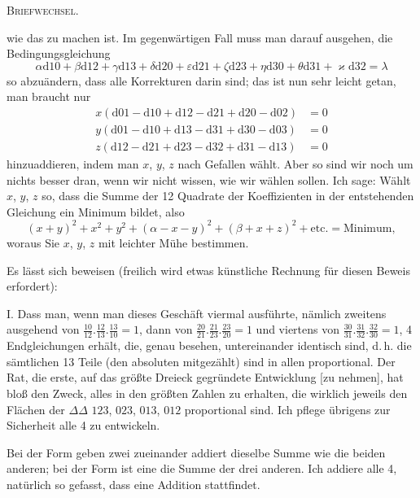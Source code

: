 \begingroup
\clearpage
{}\hfill\textsc{Briefwechsel.}\hfill\mbox{}\par\medskip
\noindent wie das zu machen ist. Im gegenwärtigen Fall muss man darauf ausgehen, die Bedingungsgleichung
\[
\alpha\mathrm d10+\beta\mathrm d12+\gamma\mathrm d13+\delta\mathrm d20+\varepsilon\mathrm d21+\zeta\mathrm d23+\eta\mathrm d30+\theta\mathrm d31+\varkappa\mathrm d32=\lambda
\]
so abzuändern, dass alle Korrekturen darin sind; das ist nun sehr leicht getan, man braucht nur
\[
\begin{aligned}
x(\mathrm d01-\mathrm d10+\mathrm d12-\mathrm d21+\mathrm d20-\mathrm d02)&=0\\
y(\mathrm d01-\mathrm d10+\mathrm d13-\mathrm d31+\mathrm d30-\mathrm d03)&=0\\
z(\mathrm d12-\mathrm d21+\mathrm d23-\mathrm d32+\mathrm d31-\mathrm d13)&=0
\end{aligned}
\]
hinzuaddieren, indem man $x$, $y$, $z$ nach Gefallen wählt. Aber so sind wir noch um nichts besser dran, wenn wir nicht wissen, wie wir wählen sollen. Ich sage: Wählt $x$, $y$, $z$ so, dass die Summe der 12 Quadrate der Koeffizienten in der entstehenden Gleichung ein Minimum bildet, also
\[
(x+y)^2+x^2+y^2+(\alpha-x-y)^2+(\beta+x+z)^2+\text{etc.}=\text{Minimum},
\]
woraus Sie $x$, $y$, $z$ mit leichter Mühe bestimmen.

Es lässt sich beweisen (freilich wird etwas künstliche Rechnung für diesen Beweis erfordert):

I. Dass man, wenn man dieses Geschäft viermal ausführte, nämlich zweitens ausgehend von $\frac{10}{12}.\allowbreak \frac{12}{13}.\allowbreak \frac{13}{10}=1$, dann von $\frac{20}{21}.\allowbreak \frac{21}{23}.\allowbreak \frac{23}{20}=1$ und viertens von $\frac{30}{31}.\allowbreak \frac{31}{32}.\allowbreak \frac{32}{30}=1$, 4 Endgleichungen erhält, die, genau besehen, untereinander identisch sind, d.\,h. die sämtlichen 13 Teile (den absoluten mitgezählt) sind in allen proportional. Der Rat, die erste, auf das größte Dreieck gegründete Entwicklung [zu nehmen], hat bloß den Zweck, alles in den größten Zahlen zu erhalten, die wirklich jeweils den Flächen der $\Delta\Delta$ $123$, $023$, $013$, $012$ proportional sind. Ich pflege übrigens zur Sicherheit alle 4 zu entwickeln.

Bei der Form  geben zwei zueinander addiert dieselbe Summe wie die beiden anderen; bei der Form  ist eine die Summe der drei anderen. Ich addiere alle 4, natürlich so gefasst, dass eine  Addition stattfindet.

